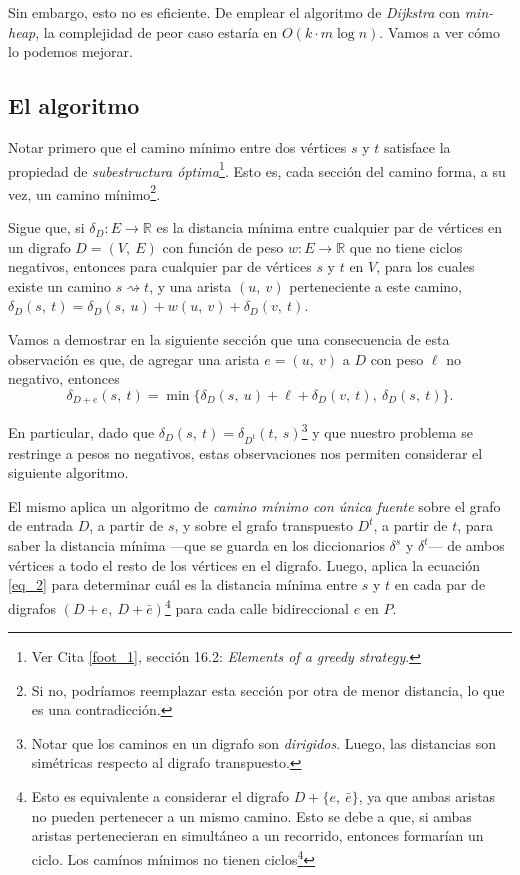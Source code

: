 Sin embargo, esto no es eficiente. De emplear el algoritmo de \textit{Dijkstra} con \textit{min-heap}, la complejidad de peor caso estaría en $O(k\cdot m\log n)$. Vamos a ver cómo lo podemos mejorar. 

\subsection{El algoritmo}

Notar primero que el camino mínimo entre dos vértices $s$ y $t$ satisface la propiedad de \textit{subestructura óptima}\footnote{Ver Cita \ref{foot_1}, sección 16.2: \textit{Elements of a greedy strategy}.}. Esto es, cada sección del camino forma, a su vez, un camino mínimo\footnote{Si no, podríamos reemplazar esta sección por otra de menor distancia, lo que es una contradicción.}. 

Sigue que, si $\delta_D : E \to \mathbb{R}$ es la distancia mínima entre cualquier par de vértices en un digrafo $D = (V,\ E)$ con función de peso $w: E \to \mathbb{R}$ que no tiene ciclos negativos, entonces para cualquier par de vértices $s$ y $t$ en $V$, para los cuales existe un camino $s \rightsquigarrow t$, y una arista $(u,\ v)$ perteneciente a este camino, $\delta_D(s,\ t) = \delta_D(s,\ u) + w(u,\ v) + \delta_D(v,\ t)$.

Vamos a demostrar en la siguiente sección que una consecuencia de esta observación es que, de agregar una arista $e = (u,\ v)$ a $D$ con peso $\ell$ no negativo, entonces 
\begin{equation}\label{eq_2}
    \delta_{D + e}(s,\ t) = \min\{\delta_{D}(s,\ u) + \ell + \delta_{D}(v,\ t),\ \delta_{D}(s,\ t)\}.
\end{equation}

En particular, dado que $\delta_D(s,\ t) = \delta_{D^t}(t,\ s)$\footnote{ Notar que los caminos en un digrafo son \textit{dirigidos}. Luego, las distancias son simétricas respecto al digrafo transpuesto.} y que nuestro problema se restringe a pesos no negativos, estas observaciones nos permiten considerar el siguiente algoritmo.



El mismo aplica un algoritmo de \textit{camino mínimo con única fuente} sobre el grafo de entrada $D$, a partir de $s$, y sobre el grafo transpuesto $D^t$, a partir de $t$, para saber la distancia mínima ---que se guarda en los diccionarios $\delta^s$ y $\delta^t$--- de ambos vértices a todo el resto de los vértices en el digrafo. Luego, aplica la ecuación \ref{eq_2} para determinar cuál es la distancia mínima entre $s$ y $t$ en cada par de digrafos $(D + e,\ D + \bar{e})$\footnote{Esto es equivalente a considerar el digrafo $D + \{e,\ \bar{e}\}$, ya que ambas aristas no pueden pertenecer a un mismo camino. Esto se debe a que, si ambas aristas pertenecieran en simultáneo a un recorrido, entonces formarían un ciclo. Los camínos mínimos no tienen ciclos\footnote{Ver cita 1, sección 24.1}} para cada calle bidireccional $e$ en $P$.

